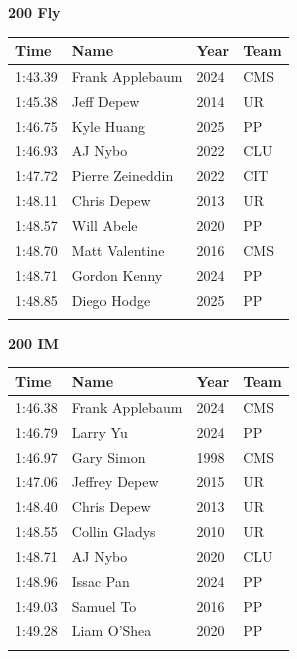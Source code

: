 \vspace{1.2em}
\noindent\begin{minipage}[t]{0.98\textwidth}
\centering
\textbf{\textcolor{teamprimary}{200 Fly}}\par
\vspace{0.5em}
\centering
\small
\renewcommand{\arraystretch}{1.0}
\setlength{\tabcolsep}{4pt}
\begin{tabular}{@{}p{2.5cm}p{4.5cm}p{1.5cm}p{2.5cm}@{}}
\toprule
\textbf{Time} & \textbf{Name} & \textbf{Year} & \textbf{Team} \\
\midrule
1:43.39 & Frank Applebaum & 2024 & CMS \\
1:45.38 & Jeff Depew & 2014 & UR \\
1:46.75 & Kyle Huang & 2025 & PP \\
1:46.93 & AJ Nybo & 2022 & CLU \\
1:47.72 & Pierre Zeineddin & 2022 & CIT \\
1:48.11 & Chris Depew & 2013 & UR \\
1:48.57 & Will Abele & 2020 & PP \\
1:48.70 & Matt Valentine & 2016 & CMS \\
1:48.71 & Gordon Kenny & 2024 & PP \\
1:48.85 & Diego Hodge & 2025 & PP \\
\bottomrule
\vspace{0.5em}
\end{tabular}
\end{minipage}
\vspace{1.2em}
\noindent\begin{minipage}[t]{0.98\textwidth}
\centering
\textbf{\textcolor{teamprimary}{200 IM}}\par
\vspace{0.5em}
\centering
\small
\renewcommand{\arraystretch}{1.0}
\setlength{\tabcolsep}{4pt}
\begin{tabular}{@{}p{2.5cm}p{4.5cm}p{1.5cm}p{2.5cm}@{}}
\toprule
\textbf{Time} & \textbf{Name} & \textbf{Year} & \textbf{Team} \\
\midrule
1:46.38 & Frank Applebaum & 2024 & CMS \\
1:46.79 & Larry Yu & 2024 & PP \\
1:46.97 & Gary Simon & 1998 & CMS \\
1:47.06 & Jeffrey Depew & 2015 & UR \\
1:48.40 & Chris Depew & 2013 & UR \\
1:48.55 & Collin Gladys & 2010 & UR \\
1:48.71 & AJ Nybo & 2020 & CLU \\
1:48.96 & Issac Pan & 2024 & PP \\
1:49.03 & Samuel To & 2016 & PP \\
1:49.28 & Liam O'Shea & 2020 & PP \\
\bottomrule
\vspace{0.5em}
\end{tabular}
\end{minipage}
